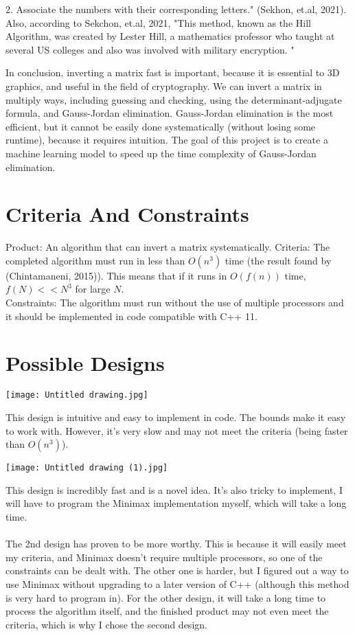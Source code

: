 \documentclass{article}
\begin{document}
2. Associate the numbers with their corresponding letters." (Sekhon, et.al, 2021). \\ Also, according to Sekchon, et.al, 2021, "This method, known as the Hill Algorithm, was created by Lester Hill, a mathematics professor who taught at several US colleges and also was involved with military encryption. "
\par In conclusion, inverting a matrix fast is important, because it is essential to 3D graphics, and useful in the field of cryptography. We can invert a matrix in multiply ways, including guessing and checking, using the determinant-adjugate formula, and Gauss-Jordan elimination. Gauss-Jordan elimination is the most efficient, but it cannot be easily done systematically (without losing some runtime), because it requires intuition. The goal of this project is to create a machine learning model to speed up the time complexity of Gauss-Jordan elimination. 
\newpage
\section*{Criteria And Constraints}
Product: An algorithm that can invert a matrix systematically.
Criteria: The completed algorithm must run in less than $O(n^3)$ time (the result found by (Chintamaneni, 2015)). This means that if it runs in $O(f(n))$ time, $f(N)<<N^3$ for large $N$. \\
Constraints: The algorithm must run without the use of multiple processors and it should be implemented in code compatible with C++ 11.
\\ 
\section*{Possible Designs}
\begin{center}\texttt{[image: Untitled drawing.jpg]}\end{center}

This design is intuitive and easy to implement in code. The bounds make it easy to work with. However, it's very slow and may not meet the criteria (being faster than $O(n^3)$).

\begin{center}\texttt{[image: Untitled drawing (1).jpg]}\end{center}


This design is incredibly fast and is a novel idea. It’s also tricky to implement, I will have to program the Minimax implementation myself, which will take a long time.
\\ \\ 
The 2nd design has proven to be more worthy. This is because it will easily meet my criteria, and Minimax doesn’t require multiple processors, so one of the constraints can be dealt with. The other one is harder, but I figured out a way to use Minimax without upgrading to a later version of C++ (although this method is very hard to program in). For the other design, it will take a long time to process the algorithm itself, and the finished product may not even meet the criteria, which is why I chose the second design. 
\end{document}
